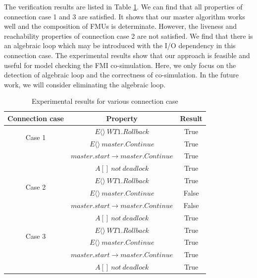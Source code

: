 The verification results are listed in Table \ref{rs}. We can find that all properties of connection case 1 and 3 are satisfied. It shows that our master algorithm works well and the composition of FMUs is determinate. However, the liveness and reachability properties of connection case 2 are not satisfied. We find that there is an algebraic loop which may be introduced with the I/O dependency in this connection case. The experimental results show that our approach is feasible and useful for model checking the FMI co-simulation.
Here, we only focus on the detection of algebraic loop and the correctness of co-simulation. In the future work, we will consider eliminating the algebraic loop.  
\begin{table}
\caption{Experimental results for various connection case}
\centering
\begin{tabular}{c c c} 
        \hline  
        Connection case & Property & Result\\
        \hline
        \multirow{2}{2.0cm}{Case 1}  
                & $E\langle\rangle~WT1.Rollback$ & True\\ 
                & $E\langle\rangle~master.Continue$ & True\\ 
                & $master.start\rightarrow master.Continue$ & True\\ 
                & $A[]~not~deadlock$ & True\\   
        \hline 
        \multirow{2}{2.0cm}{Case 2}  
                & $E\langle\rangle~WT1.Rollback$ & True\\ 
                & $E\langle\rangle~master.Continue$ & False\\ 
                & $master.start\rightarrow master.Continue$ & False\\ 
                & $A[]~not~deadlock$ & True\\   
        \hline 
        \multirow{2}{2.0cm}{Case 3}  
                & $E\langle\rangle~WT1.Rollback$ & True\\ 
                & $E\langle\rangle~master.Continue$ & True\\ 
                & $master.start \rightarrow master.Continue$ & True\\ 
                & $A[]~not~deadlock$ & True\\   
        \hline 
\end{tabular} 
\label{rs}
\end{table}




